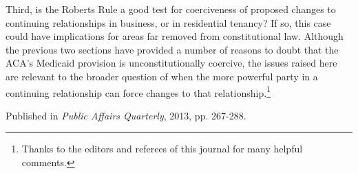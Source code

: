 \documentclass[
  11pt,
  letterpaper,
  DIV=11,
  numbers=noendperiod,
  twoside]{scrartcl}
\begin{document}
Third, is the Roberts Rule a good test for coerciveness of proposed
changes to continuing relationships in business, or in residential
tenancy? If so, this case could have implications for areas far removed
from constitutional law. Although the previous two sections have
provided a number of reasons to doubt that the ACA's Medicaid provision
is unconstitutionally coercive, the issues raised here are relevant to
the broader question of when the more powerful party in a continuing
relationship can force changes to that relationship.\footnote{Thanks to
  the editors and referees of this journal for many helpful comments.}

\vspace{1cm}



\noindent Published in\emph{
Public Affairs Quarterly}, 2013, pp. 267-288.
\end{document}
